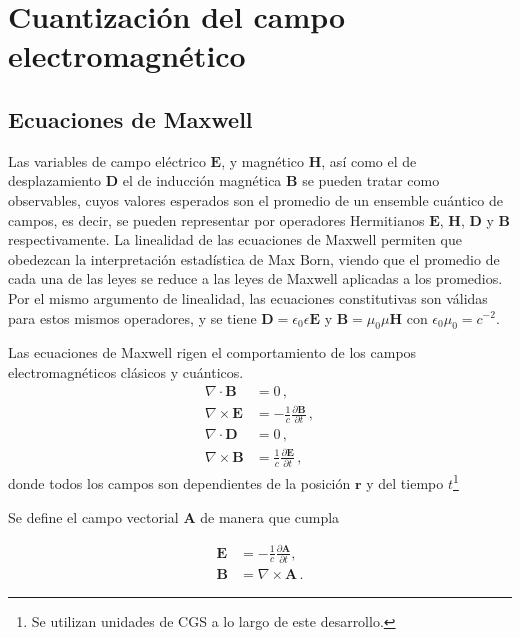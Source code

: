 \chapter{Cuantizaci\'on del campo electromagn\'etico}

\section{Ecuaciones de Maxwell}

Las variables de campo eléctrico $\mathbf{E}$, y magnético $\mathbf{H}$, así como el de desplazamiento $\mathbf{D}$ el de inducción magnética $\mathbf{B}$ se pueden tratar como observables, cuyos valores esperados son el promedio de un ensemble cuántico de campos, es decir, se pueden representar por operadores Hermitianos $\mathbf{E}$, $\mathbf{H}$, $\mathbf{D}$ y $\mathbf{B}$ respectivamente. La linealidad de las ecuaciones de Maxwell permiten que obedezcan la interpretación estadística de Max Born, viendo que el promedio de cada una de las leyes se reduce a las leyes de Maxwell aplicadas a los promedios. Por el mismo argumento de linealidad, las ecuaciones constitutivas son válidas para estos mismos operadores, y se tiene $\mathbf{D} = \epsilon_0 \epsilon \mathbf{E}$ y $\mathbf{B} = \mu_0 \mu \mathbf{H}$ con $\epsilon_0 \mu_0 = c^{-2}$.

Las ecuaciones de Maxwell rigen el comportamiento de los campos electromagnéticos clásicos y cuánticos.
\begin{align}
\nabla \cdot \mathbf{B}  & = 0 \,,                                              \label{EM.1} \\
\nabla \times \mathbf{E} & = - \frac{1}{c} \frac{\partial \mathbf{B}}{\partial t}\,,      \label{EM.2} \\
\nabla \cdot \mathbf{D}  & = 0 \,,                                        \label{EM.3}  \\
\nabla \times \mathbf{B} & = \frac{1}{c}
\frac{\partial \mathbf{E}}{\partial t}\,, \label{EM.4}
\end{align}
donde todos los campos son dependientes de la posición $\mathbf{r}$ y del tiempo $t$\footnote{Se utilizan unidades de CGS a lo largo de este desarrollo.}



Se define el campo vectorial $\mathbf{A}$ de manera que cumpla

\begin{align}
\mathbf{E} &= -\frac{1}{c}\frac{\partial \mathbf{A}}{\partial t}, \label{EM.5} \\
\mathbf{B} &= \nabla \times \mathbf{A}\,.\label{EM.6}
\end{align}

